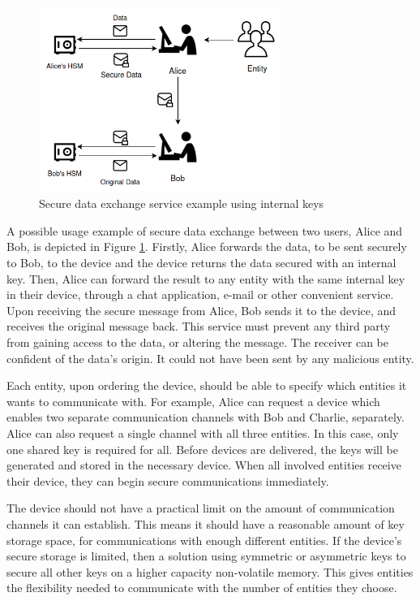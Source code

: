 \begin{figure}[h!]
    \centering
    \includegraphics[width=0.7\textwidth]{./Images/user-data-service.png}
    \caption{Secure data exchange service example using internal keys}
    \label{fig:user:data-service}
\end{figure}

A possible usage example of secure data exchange between two users, Alice and Bob, is depicted in Figure \ref{fig:user:data-service}. Firstly, Alice forwards the data, to be sent securely to Bob, to the device and the device returns the data secured with an internal key. Then, Alice can forward the result to any entity with the same internal key in their device, through a chat application, e-mail or other convenient service.
Upon receiving the secure message from Alice, Bob sends it to the device, and receives the original message back.
This service must prevent any third party from gaining access to the data, or altering the message. The receiver can be confident of the data's origin. It could not have been sent by any malicious entity.

Each entity, upon ordering the device, should be able to specify which entities it wants to communicate with.
For example, Alice can request a device which enables two separate communication channels with Bob and Charlie, separately. Alice can also request a single channel with all three entities. In this case, only one shared key is required for all.
Before devices are delivered, the keys will be generated and stored in the necessary device. When all involved entities receive their device, they can begin secure communications immediately.

The device should not have a practical limit on the amount of communication channels it can establish. This means it should have a reasonable amount of key storage space, for communications with enough different entities.
If the device's secure storage is limited, then a solution using symmetric or asymmetric keys to secure all other keys on a higher capacity non-volatile memory.
This gives entities the flexibility needed to communicate with the number of entities they choose.

